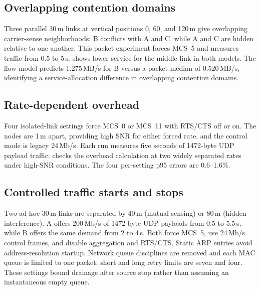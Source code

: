 \subsection{Overlapping contention domains}

Three parallel 30\,m links at vertical positions 0, 60, and 120\,m give
overlapping carrier-sense neighborhoods: B conflicts with A and C, while
A and C are hidden relative to one another. This packet experiment forces
MCS~5 and measures traffic from 0.5 to 5\,s.
 shows lower service for the middle link in
both models. The flow model predicts
1.275\,MB/s for B versus a packet median of 0.520\,MB/s, identifying a
service-allocation difference in overlapping contention domains.

\begin{table}[t]
\centering
\caption{Overlapping domains: per-link goodput across twenty seeds.
IQR is the interquartile range; p95 is the sample 95th percentile of
absolute relative error with packet goodput as denominator.}
\label{tab:packet_asymmetric}
\small

\end{table}

\subsection{Rate-dependent overhead}

Four isolated-link settings force MCS~0 or MCS~11 with RTS/CTS off or on.
The nodes are 1\,m apart, providing high SNR for either forced rate, and
the control mode is legacy 24\,Mb/s. Each run measures five seconds of
1472-byte UDP payload traffic.  checks the overhead
calculation at two widely separated rates under high-SNR conditions.
The four per-setting p95 errors are 0.6--1.6\%.

\begin{table}[t]
\centering
\caption{Isolated-link overhead checks, with twenty packet seeds per row.}
\label{tab:packet_rates}
\small

\end{table}

\subsection{Controlled traffic starts and stops}

Two ad hoc 30\,m links are separated by 40\,m (mutual sensing) or 80\,m
(hidden interference). A offers 200\,Mb/s of 1472-byte UDP payloads from
0.5 to 5.5\,s, while B offers the same demand from 2 to 4\,s. Both force
MCS~5, use 24\,Mb/s control frames, and disable aggregation and RTS/CTS.
Static ARP entries avoid address-resolution startup. Network queue
disciplines are removed and each MAC queue is limited to one packet;
short and long retry limits are seven and four. These settings bound
drainage after source stop rather than assuming an instantaneous empty queue.

